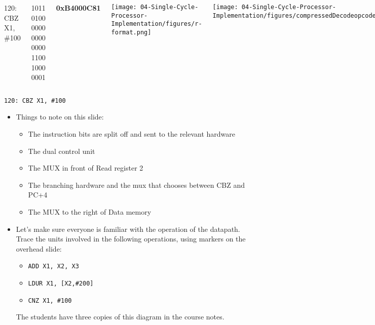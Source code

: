 \begin{frame}[fragile]\ifnum{}
\ifnum{}
\begin{columns}
        {\footnotesize 120: {\color{red}CBZ} {\color{orange}X1}, {\color{blue}\#100} 
  
  {\color{red}1011 0100} {\color{blue}0000 0000 0000 1100 100}{\color{orange}0 0001}}

{\footnotesize \textbf{0xB4000C81}}

  \texttt{[image: 04-Single-Cycle-Processor-Implementation/figures/r-format.png]}

  

    \texttt{[image: 04-Single-Cycle-Processor-Implementation/figures/compressedDecodeopcodes.png]}

    \texttt{[image: 04-Single-Cycle-Processor-Implementation/figures/compressedDecodeSignals.png]}

    \vspace{5cm}

\end{columns}
\fi

\ifnum{}
{\tt 120: CBZ X1, \#100}

\fi
  \else
\fi

\BNotes\ifnum{}
\begin{itemize}
\item Things to note on this slide:
\begin{itemize}
	\item The instruction bits are split off and sent to the
		relevant hardware
	\item The dual control unit
	\item The MUX in front of Read register 2
	\item The branching hardware and the mux that chooses between
		CBZ and PC+4
	\item The MUX to the right of Data memory
\end{itemize}
\item Let's
make sure everyone is familiar with the operation of the
datapath. Trace the units involved in the following operations, using
markers on the overhead slide:
\begin{itemize}
\item {\tt ADD X1, X2, X3}
\item {\tt LDUR X1, [X2,\#200]}
\item {\tt CNZ X1, \#100}
\end{itemize}
	The students have three copies of this diagram in the course notes.
\end{itemize}
\fi\ENotes
\end{frame}


